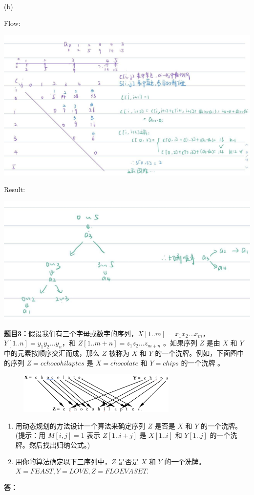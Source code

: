 \documentclass[12pt,a4paper]{article}
\begin{document}
\begin{CJK*}{UTF8}{gbsn}
\begin{itemize}
			\end{itemize} (b) 

			Flow:

			\includegraphics[width=15cm]{img/answ2.jpg}

			Result:

			\includegraphics[width=15cm]{img/answ2_2.jpg}

			\vspace{10pt}
			\noindent
			{\bf 题目3：}假设我们有三个字母或数字的序列，$X[1..m]  = x_1x_2 ... x_m$， $Y[1..n]  = y_1y_2...y_n$，和 $Z[1..m+n] = z_1z_2...z_{m+n}$ 。如果序列 $Z$ 是由 $X$ 和 $Y$ 中的元素按顺序交汇而成，那么 $Z$  被称为 $X$ 和 $Y$ 的一个洗牌。例如，下面图中的序列 $Z = cchocohilaptes$ 是 $X = chocolate$ 和 $Y = chips$ 的一个洗牌 。
			\begin{figure}[h]
				\centering %
				\includegraphics[width=0.7\textwidth]{3} %
			\end{figure}
			\begin{enumerate}
				\item[(a)]  用动态规划的方法设计一个算法来确定序列 $Z$ 是否是 $X$ 和 $Y$ 的一个洗牌。(提示：用 $M[i, j] = 1$ 表示 $Z[1..i+j]$ 是 $X[1..i]$ 和 $Y[1..j]$ 的一个洗牌。然后找出归纳公式。)
				\item[(b)]  用你的算法确定以下三序列中，$Z$ 是否是 $X$ 和 $Y$ 的一个洗牌。\\
					$X = FEAST, 	Y = LOVE, 	Z =  FLOEVASET$.
			\end{enumerate}
			\vspace{5pt}
			\noindent
			{\bf 答：}


\end{CJK*}
\end{document}
